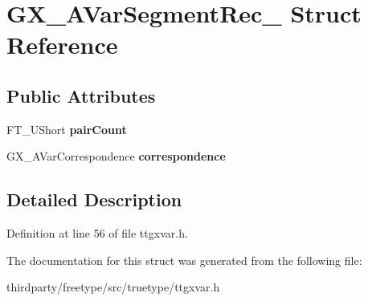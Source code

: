 \hypertarget{struct_g_x___a_var_segment_rec__}{}\section{G\+X\+\_\+\+A\+Var\+Segment\+Rec\+\_\+ Struct Reference}
\label{struct_g_x___a_var_segment_rec__}
\subsection*{Public Attributes}
\begin{DoxyCompactItemize}
\item 
\mbox{\label{struct_g_x___a_var_segment_rec___a6294d18a885a0ee5d97a1681ca3a320a}} 
F\+T\+\_\+\+U\+Short {\bfseries pair\+Count}
\item 
\mbox{\label{struct_g_x___a_var_segment_rec___ac63832f9884f20e57d9e6952f403007d}} 
G\+X\+\_\+\+A\+Var\+Correspondence {\bfseries correspondence}
\end{DoxyCompactItemize}


\subsection{Detailed Description}


Definition at line 56 of file ttgxvar.\+h.



The documentation for this struct was generated from the following file\+:\begin{DoxyCompactItemize}
\item 
thirdparty/freetype/src/truetype/ttgxvar.\+h\end{DoxyCompactItemize}
